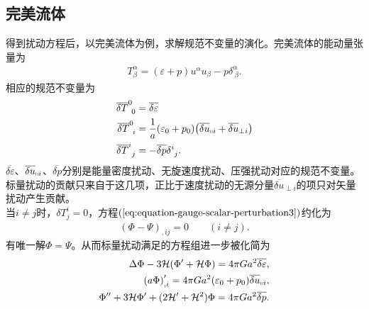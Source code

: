 \documentclass{article}
\begin{document}
  \subsection{完美流体}
  得到扰动方程后，以完美流体为例，求解规范不变量的演化。完美流体的能动量张量为
  \begin{align}
    \label{eq:perfect-fluid}
    T^{\alpha}_{\beta}=(\varepsilon+p)u^{\alpha}u_{\beta}-p\delta^{\alpha}_{\ \beta}.
  \end{align}
  相应的规范不变量为
  \begin{align}
    \label{eq:perfect-fluid-gauge-invariant-variable}
    \overline{\delta{T}}^{0}_{\ 0} &= \overline{\delta{\varepsilon}} \\
    \overline{\delta{T}}^{0}_{\ i} &=
    \frac{1}{a}(\varepsilon_0+p_0){\left(\overline{\delta{u}}_{\shortparallel
          i}+\overline{\delta{u}}_{\perp i}\right)} \\
    \overline{\delta{T}}^{i}_{\ j}&= -\overline{\delta{p}}\delta^{i}_{\ j}.
  \end{align}
  $\overline{\delta{\varepsilon}}$、$\overline{\delta{u}}_{\shortparallel
  i}$、$\overline{\delta{p}}$分别是能量密度扰动、无旋速度扰动、压强扰动对应的规范不变量。
  标量扰动的贡献只来自于这几项，正比于速度扰动的无源分量$\overline{\delta{u}}_{\perp
  i}$的项只对矢量扰动产生贡献。\\
  当$i\neq
  j$时，$\delta{T}^{i}_{j}=0$，方程$(\ref{eq:equation-gauge-scalar-perturbation3})$约化为
  \begin{align}
    {\left(\Phi-\Psi\right)}_{,ij}=0\qquad (i\neq j).
  \end{align}
  有唯一解$\Phi=\Psi$。从而标量扰动满足的方程组进一步被化简为
  \begin{align}
    \label{eq:simplified-equation-gauge-scalar-perturbation}
    \Delta \Phi -3\mathcal{H}{\left(\Phi^\prime+\mathcal{H}\Phi\right)} =
    4\pi Ga^2\overline{\delta{\varepsilon}}, \\
    {\left(a\Phi\right)}^{\prime}_{,i}=4\pi
    Ga^2{\left(\varepsilon_0+p_0\right)}\overline{\delta{u}}_{\shortparallel i}, \\
    \Phi^{\prime\prime}+3\mathcal{H}\Phi^\prime+(2\mathcal{H}^{\prime}+\mathcal{H}^2)\Phi=
    4\pi Ga^2\overline{\delta{p}}.
  \end{align}
  
  
\end{document}
